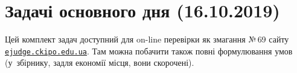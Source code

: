 \documentclass[10pt,a5paper]{extarticle}
\begin{document}
\tableofcontents

\sloppy



% 



\section{Задачі основного дня (16.10.2019)}

Цей комплект задач доступний для on-line перевірки як змагання №$\,$69
сайту \href{https://ejudge.ckipo.edu.ua}{\texttt{ejudge.ckipo.edu.ua}}.
Там можна побачити також повні формулювання умов (у~збірнику, задля економії місця, вони скорочені).
 
\newenvironment{problemAllDefault}[1]{\smallskip\begin{problem}{#1}{Вхідні дані}{Результати}{1 сек}{256 мегабайтів}}{\end{problem}}



            
            
            
            

            
            


\end{document}
